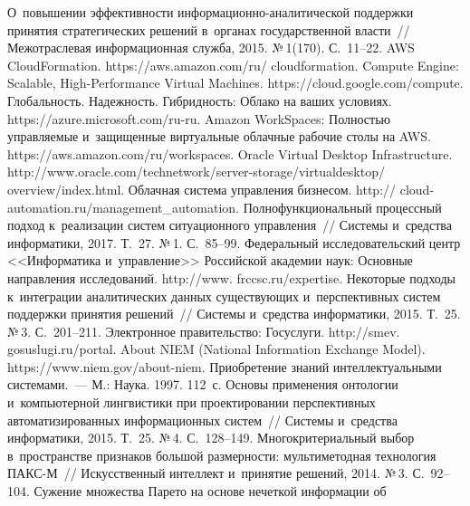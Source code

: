 \begin{multicols}{2}
{{\begin{thebibliography}{99}
 О~повышении эффективности ин\-фор\-ма\-ци\-он\-но-ана\-ли\-ти\-че\-ской 
поддержки принятия стратегических решений в~органах государственной власти~// 
Межотраслевая информационная служба, 2015. №\,1(170). С.~11--22.
AWS CloudFormation. {\sf https://aws.amazon.com/ru/ cloudformation}.
Compute Engine: Scalable, High-Performance Virtual Machines. {\sf 
https://cloud.google.com/compute}. 
Глобальность. Надежность. Гибридность: Облако на ваших условиях. {\sf 
https://azure.microsoft.com/ru-ru}.
Amazon WorkSpaces: Полностью управляемые и~защищенные виртуальные облачные 
рабочие столы на AWS. {\sf https://aws.amazon.com/ru/workspaces.}
Oracle Virtual Desktop Infrastructure. {\sf  
http://www.\linebreak oracle.com/technetwork/server-storage/virtualdesktop/ overview/index.html.} 
Облачная система управления бизнесом. {\sf http:// cloud-automation.ru/management\_automation.}
 Полнофункциональный процессный подход к~реализации сис\-тем 
ситуационного управ\-ле\-ния~// Сис\-те\-мы и~средства информатики, 2017. Т.~27. №\,1.  
С.~85--99.
Федеральный исследовательский центр <<Информатика и~управ\-ле\-ние>> 
Российской академии наук: Основные на\-прав\-ле\-ния исследований. {\sf 
http://www. frccsc.ru/expertise.}
 Некоторые подходы к~интеграции аналитических данных 
су\-ще\-ст\-ву\-ющих и~перспективных сис\-тем поддержки принятия решений~// Системы 
и~средства информатики, 2015. Т.~25. №\,3. С.~201--211.
Электронное правительство: Госуслуги. {\sf http://smev. gosuslugi.ru/portal}.
About NIEM (National Information Exchange Model). {\sf https://www.niem.gov/about-niem}.
 Приобретение знаний интеллектуальными сис\-те\-ма\-ми.~--- М.: Наука. 
1997. 112~с.
 Основы 
применения онтологии и~компьютерной лингвистики при проектировании перспективных 
автоматизированных информационных сис\-тем~// Сис\-те\-мы и~средства информатики, 
2015. Т.~25. №\,4. С.~128--149.
 Многокритериальный выбор в~про\-стран\-ст\-ве 
признаков большой раз\-мер\-ности: мультиметодная технология ПАКС-М~// 
Искусственный интеллект и~принятие решений, 2014. №\,3. С.~92--104.
 Сужение множества Парето на основе нечеткой информации об 

\end{thebibliography}}}
\end{multicols}
